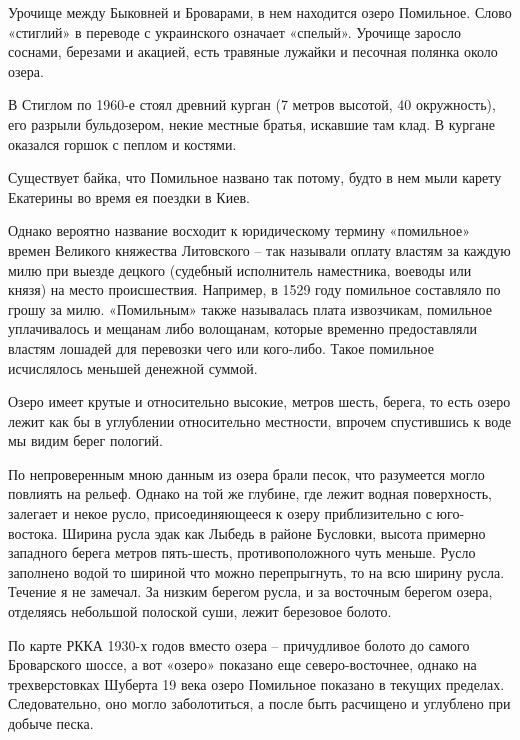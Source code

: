 Урочище между Быковней и Броварами, в нем находится озеро Помильное. Слово «стиглий» в переводе с украинского означает «спелый». Урочище заросло соснами, березами и акацией, есть травяные лужайки и песочная полянка около озера.

В Стиглом по 1960-е стоял древний курган (7 метров высотой, 40 окружность), его разрыли бульдозером, некие местные братья, искавшие там клад. В кургане оказался горшок с пеплом и костями.

Существует байка, что Помильное названо так потому, будто в нем мыли карету Екатерины во время ея поездки в Киев.

Однако вероятно название восходит к юридическому термину «помильное» времен Великого княжества Литовского – так называли оплату властям за каждую милю при выезде децкого (судебный исполнитель наместника, воеводы или князя) на место происшествия. Например, в 1529 году помильное составляло по грошу за милю. «Помильным» также называлась плата извозчикам, помильное уплачивалось и мещанам либо волощанам, которые временно предоставляли властям лошадей для перевозки чего или кого-либо. Такое помильное исчислялось меньшей денежной суммой.

Озеро имеет крутые и относительно высокие, метров шесть, берега, то есть озеро лежит как бы в углублении относительно местности, впрочем спустившись к воде мы видим берег пологий.
 
По непроверенным мною данным из озера брали песок, что разумеется могло повлиять на рельеф. Однако на той же глубине, где лежит водная поверхность, залегает и некое русло, присоединяющееся к озеру приблизительно с юго-востока. Ширина русла эдак как Лыбедь в районе Бусловки, высота примерно западного берега метров пять-шесть, противоположного чуть меньше. Русло заполнено водой то шириной что можно перепрыгнуть, то на всю ширину русла. Течение я не замечал. За низким берегом русла, и за восточным берегом озера, отделяясь небольшой полоской суши, лежит березовое болото.

По карте РККА 1930-х годов вместо озера – причудливое болото до самого Броварского шоссе, а вот «озеро» показано еще северо-восточнее, однако на трехверстовках Шуберта 19 века озеро Помильное показано в текущих пределах. Следовательно, оно могло заболотиться, а после быть расчищено и углублено при добыче песка.\\

\medskip


